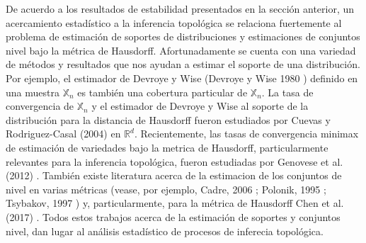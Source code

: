 De acuerdo a los resultados de estabilidad presentados en la secci\'on anterior, un acercamiento
estad\'istico a la inferencia topol\'ogica se relaciona fuertemente al problema de estimaci\'on de
soportes de distribuciones y estimaciones de conjuntos nivel bajo la m\'etrica de Hausdorff.
Afortunadamente se cuenta con una variedad de m\'etodos y resultados que nos ayudan a estimar el soporte de
una distribuci\'on. Por ejemplo, el estimador de Devroye y Wise
(Devroye y Wise 1980 \cite{DevroyeWise1980}) definido en una muestra $\mathbb{X}_{n}$ es tambi\'en una
cobertura  particular de $\mathbb{X}_{n}$. La tasa de convergencia de $\mathbb{X}_{n}$ y el estimador
de Devroye y Wise al soporte de la distribuci\'on para la distancia de Hausdorff fueron estudiados por
Cuevas y Rodriguez-Casal (2004) \cite{CuevasRodriguezCasal2004} en $\mathbb{R}^{d}$. Recientemente, las
tasas de convergencia minimax de estimaci\'on de variedades bajo la metrica de Hausdorff, particularmente
relevantes para la inferencia topol\'ogica, fueron estudiadas por Genovese et al. (2012)
\cite{Genovese2012}. Tambi\'en existe literatura acerca de la estimacion de los conjuntos de nivel en
varias m\'etricas (vease, por ejemplo, Cadre, 2006 \cite{Cadre2006}; Polonik, 1995 \cite{Polonik1995};
Tsybakov, 1997 \cite{Tsybakov1997}) y, particularmente, para la m\'etrica de Hausdorff Chen et al.
(2017) \cite{Chen2017}. Todos estos trabajos acerca de la estimaci\'on de soportes y conjuntos nivel,
dan lugar al an\'alisis estad\'istico de procesos de inferecia topol\'ogica.

